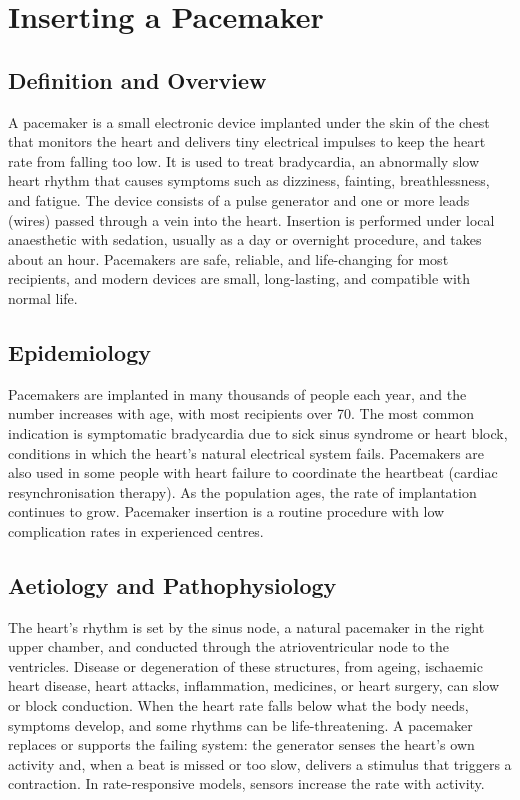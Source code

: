 \chapter{Inserting a Pacemaker}

\section*{Definition and Overview}
A pacemaker is a small electronic device implanted under the skin of the chest that monitors the heart and delivers tiny electrical impulses to keep the heart rate from falling too low. It is used to treat bradycardia, an abnormally slow heart rhythm that causes symptoms such as dizziness, fainting, breathlessness, and fatigue. The device consists of a pulse generator and one or more leads (wires) passed through a vein into the heart. Insertion is performed under local anaesthetic with sedation, usually as a day or overnight procedure, and takes about an hour. Pacemakers are safe, reliable, and life-changing for most recipients, and modern devices are small, long-lasting, and compatible with normal life.

\section*{Epidemiology}
Pacemakers are implanted in many thousands of people each year, and the number increases with age, with most recipients over 70. The most common indication is symptomatic bradycardia due to sick sinus syndrome or heart block, conditions in which the heart's natural electrical system fails. Pacemakers are also used in some people with heart failure to coordinate the heartbeat (cardiac resynchronisation therapy). As the population ages, the rate of implantation continues to grow. Pacemaker insertion is a routine procedure with low complication rates in experienced centres.

\section*{Aetiology and Pathophysiology}
The heart's rhythm is set by the sinus node, a natural pacemaker in the right upper chamber, and conducted through the atrioventricular node to the ventricles. Disease or degeneration of these structures, from ageing, ischaemic heart disease, heart attacks, inflammation, medicines, or heart surgery, can slow or block conduction. When the heart rate falls below what the body needs, symptoms develop, and some rhythms can be life-threatening. A pacemaker replaces or supports the failing system: the generator senses the heart's own activity and, when a beat is missed or too slow, delivers a stimulus that triggers a contraction. In rate-responsive models, sensors increase the rate with activity.

